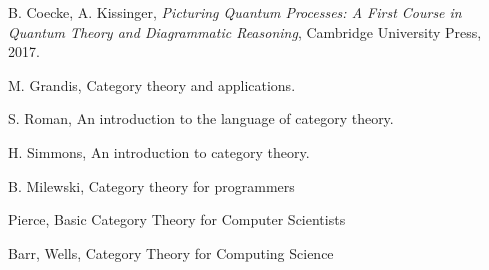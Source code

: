 \documentclass[10pt, article, one side]{memoir}
\begin{document}
    
    
\begin{thebibliography}{00}

  
  B. Coecke, A. Kissinger,
  \emph{Picturing Quantum Processes: A First Course in Quantum Theory and Diagrammatic Reasoning},
  Cambridge University Press, 2017.
  
  
  M. Grandis, Category theory and applications.

 S. Roman, An introduction to the language of category theory.

H. Simmons, An introduction to category theory. 


 B. Milewski, Category theory for programmers

 Pierce, Basic Category Theory for Computer Scientists

 Barr, Wells, Category Theory for Computing Science

\end{thebibliography}
    
    
\end{document}

